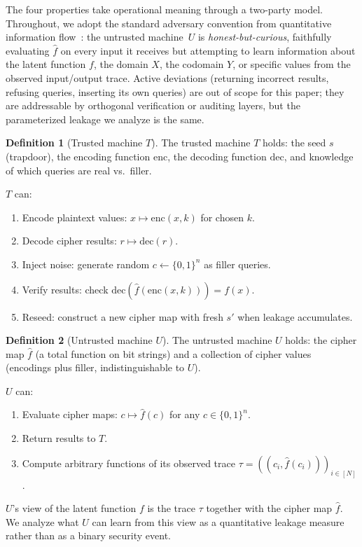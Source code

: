 \documentclass[11pt]{article}
\theoremstyle{definition}
\newtheorem{definition}{Definition}[section]
\theoremstyle{plain}
\theoremstyle{remark}
\newcommand{\fhat}{\hat{f}}
\newcommand{\enc}{\mathrm{enc}}
\newcommand{\dec}{\mathrm{dec}}
\begin{document}
The four properties take operational meaning through a two-party model.
Throughout, we adopt the standard adversary convention from quantitative
information flow~\cite{smith2009foundations}: the untrusted machine~$U$
is \emph{honest-but-curious}, faithfully evaluating $\fhat$ on every
input it receives but attempting to learn information about the latent
function $f$, the domain $X$, the codomain $Y$, or specific values from
the observed input/output trace.  Active deviations (returning incorrect
results, refusing queries, inserting its own queries) are out of scope
for this paper; they are addressable by orthogonal verification or
auditing layers, but the parameterized leakage we analyze is the same.

\begin{definition}[Trusted machine $T$]
\label{def:trusted}
The trusted machine $T$ holds: the seed $s$ (trapdoor), the encoding
function $\enc$, the decoding function $\dec$, and knowledge of which
queries are real vs.\ filler.

$T$ can:
\begin{enumerate}
\item Encode plaintext values: $x \mapsto \enc(x, k)$ for chosen $k$.
\item Decode cipher results: $r \mapsto \dec(r)$.
\item Inject noise: generate random $c \gets \{0,1\}^n$ as filler queries.
\item Verify results: check $\dec(\fhat(\enc(x,k))) = f(x)$.
\item Reseed: construct a new cipher map with fresh $s'$ when leakage accumulates.
\end{enumerate}
\end{definition}

\begin{definition}[Untrusted machine $U$]
\label{def:untrusted}
The untrusted machine $U$ holds: the cipher map $\fhat$ (a total function
on bit strings) and a collection of cipher values (encodings plus filler,
indistinguishable to $U$).

$U$ can:
\begin{enumerate}
\item Evaluate cipher maps: $c \mapsto \fhat(c)$ for any
    $c \in \{0,1\}^n$.
\item Return results to $T$.
\item Compute arbitrary functions of its observed
    trace $\tau = ((c_i, \fhat(c_i)))_{i \in [N]}$.
\end{enumerate}

$U$'s view of the latent function $f$ is the trace $\tau$ together with
the cipher map $\fhat$.  We analyze what $U$ can learn from this view as
a quantitative leakage measure rather than as a binary security event.
\end{definition}
\end{document}
